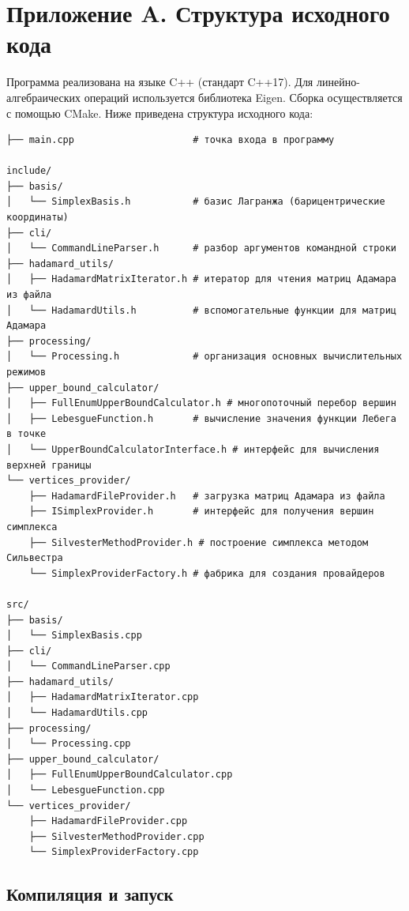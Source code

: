 \documentclass[a4paper,12pt]{article}
\theoremstyle{indented}
\begin{document}
\newpage

\printbibliography

\newpage


\section*{Приложение A. Структура исходного кода}

Программа реализована на языке C++ (стандарт C++17). Для линейно-алгебраических операций используется библиотека Eigen. Сборка осуществляется с помощью CMake. Ниже приведена структура исходного кода:

\begin{verbatim}
├── main.cpp                     # точка входа в программу

include/
├── basis/
│   └── SimplexBasis.h           # базис Лагранжа (барицентрические координаты)
├── cli/
│   └── CommandLineParser.h      # разбор аргументов командной строки
├── hadamard_utils/
│   ├── HadamardMatrixIterator.h # итератор для чтения матриц Адамара из файла
│   └── HadamardUtils.h          # вспомогательные функции для матриц Адамара
├── processing/
│   └── Processing.h             # организация основных вычислительных режимов
├── upper_bound_calculator/
│   ├── FullEnumUpperBoundCalculator.h # многопоточный перебор вершин
│   ├── LebesgueFunction.h       # вычисление значения функции Лебега в точке
│   └── UpperBoundCalculatorInterface.h # интерфейс для вычисления верхней границы
└── vertices_provider/
    ├── HadamardFileProvider.h   # загрузка матриц Адамара из файла
    ├── ISimplexProvider.h       # интерфейс для получения вершин симплекса
    ├── SilvesterMethodProvider.h # построение симплекса методом Сильвестра
    └── SimplexProviderFactory.h # фабрика для создания провайдеров

src/
├── basis/
│   └── SimplexBasis.cpp
├── cli/
│   └── CommandLineParser.cpp
├── hadamard_utils/
│   ├── HadamardMatrixIterator.cpp
│   └── HadamardUtils.cpp
├── processing/
│   └── Processing.cpp
├── upper_bound_calculator/
│   ├── FullEnumUpperBoundCalculator.cpp
│   └── LebesgueFunction.cpp
└── vertices_provider/
    ├── HadamardFileProvider.cpp
    ├── SilvesterMethodProvider.cpp
    └── SimplexProviderFactory.cpp
\end{verbatim}

\subsection*{Компиляция и запуск}
\end{document}
